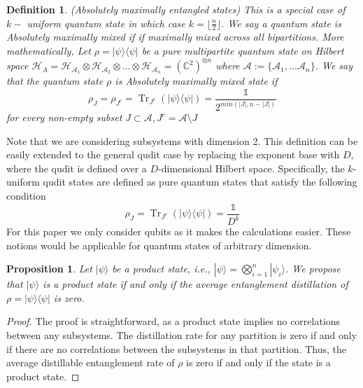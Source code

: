 \documentclass{article}
\newtheorem{definition}[theorem]{Definition}
\newtheorem{prop}[theorem]{Proposition}
\DeclareMathOperator{\Tr}{Tr}
\newcommand{\ket}[1]{|#1\rangle}
\newcommand{\ketbra}[2]{| #1\rangle\! \langle #2|}
\newcommand{\identity}{\mathds{1}}
\begin{document}
\begin{definition}
    (Absolutely maximally entangled states)
    \label{def:AME_state}
    This is a special case of $k - $ uniform quantum state in which case $k = \lfloor \frac{n}{2} \rfloor$. We say a quantum state is Absolutely maximally mixed if if maximally mixed across all bipartitions. More mathematically,   Let $\rho = \ketbra{\psi}{\psi}$ be a pure multipartite quantum state on Hilbert space $\mathcal{H}_A = \mathcal{H}_{\mathcal{A}_1} \otimes \mathcal{H}_{\mathcal{A}_2} \otimes \dots \otimes \mathcal{H}_{\mathcal{A}_n} = (\mathbb{C}^2)^{\otimes n}$  where $\mathcal{A} := \{\mathcal{A}_1, \ldots \mathcal{A}_n\}$. We say that the quantum state $\rho$ is Absolutely maximally mixed state if 
        \begin{equation}
        \rho_J = \rho_{J^c} = \Tr_{J^c}(\ketbra{\psi}{\psi}) = \frac{\identity}{2^{min({|J|, n - |J|})}}
    \end{equation}
    for every non-empty subset $ J \subset \mathcal{A}, J^c = \mathcal{A} \setminus J$
\end{definition}

Note that we are considering subsystems with dimension 2. This definition can be easily extended to the general qudit case by replacing the exponent base with $D$, where the qudit is defined over a $D$-dimensional Hilbert space. Specifically, the $k$-uniform qudit states are defined as pure quantum states that satisfy the following condition
    \begin{equation}
        \rho_J = \Tr_{J^c}(\ketbra{\psi}{\psi}) = \frac{\identity}{D^{k}}
    \end{equation}
For this paper we only consider qubits as it makes the calculations easier. These notions would be applicable for quantum states of arbitrary dimension.


\begin{prop}
Let $\ket{\psi}$ be a product state, i.e., $\ket{\psi} = \bigotimes_{i=1}^{n} \ket{\psi_i}$. We propose that $\ket{\psi}$ is a product state if and only if the average entanglement distillation of $\rho = \ketbra{\psi}{\psi}$ is zero.
\end{prop}
\begin{proof}
The proof is straightforward, as a product state implies no correlations between any subsystems. The distillation rate for any partition is zero if and only if there are no correlations between the subsystems in that partition. Thus, the average distillable entanglement rate of $\rho$ is zero if and only if the state is a product state.
\end{proof}
\end{document}
